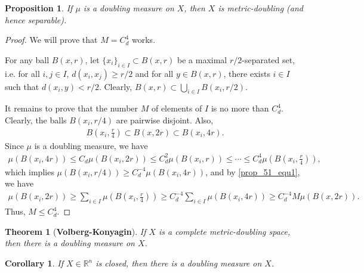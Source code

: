 \documentclass[11pt]{book}
\newtheorem{theorem}{Theorem}[chapter]
\newtheorem{corollary}{Corollary}[theorem]
\newtheorem{proposition}{Proposition}[chapter]
\theoremstyle{definition}
\numberwithin{equation}{chapter}
\begin{document}
\begin{proposition}\label{prop_51}
If $\mu$ is a doubling measure on $X$, then $X$ is metric-doubling (and hence separable).
\end{proposition}
\begin{proof}
We will prove that $M = C_d^4$ works. 

For any ball $B(x,r)$, let $\{x_i\}_{i\in I} \subset B(x,r)$ be a maximal $r/2$-separated set, i.e. for all $i,j\in I$, $d(x_i,x_j) \geq r/2$ and for all $y \in B(x,r)$, there exists $i \in I$ such that $d(x_i,y) < r/2$. Clearly, $B(x,r) \subset \bigcup_{i \in I} B\left(x_i,r/2\right)$.

It remains to prove that the number $M$ of elements of $I$ is no more than $C_d^4$. Clearly, the balls $B\left(x_i,r/4\right)$ are pairwise disjoint. Also, 
\begin{align}\label{prop_51_equ1}
    B\left(x_i,\frac{r}{4}\right) \subset B\left(x,2r\right) \subset B\left(x_i,4r\right).
\end{align}
Since $\mu$ is a doubling measure, we have
\begin{align*}
    \mu(B\left(x_i,4r\right)) \leq C_d \mu(B\left(x_i,2r\right)) \leq C_d^2 \mu(B\left(x_i,r\right)) \leq \cdots \leq C_d^4 \mu \left(B\left(x_i,\frac{r}{4}\right)\right),
\end{align*}
which implies $\mu \left(B\left(x_i,r/4\right)\right) \geq C_d^{-4} \mu \left(B\left(x_i,4r\right)\right)$, and by \eqref{prop_51_equ1}, we have
\begin{align*}
    \mu \left(B\left(x_i,2r\right)\right) \geq \sum_{i\in I} \mu\left(B\left(x_i,\frac{r}{4}\right)\right) \geq C_d^{-4} \sum_{i\in I} \mu \left(B\left(x_i,4r\right)\right) \geq C_d^{-4} M \mu \left(B\left(x,2r\right)\right).
\end{align*}
Thus, $M \leq C_d^4$.
\end{proof}

\medskip

\begin{theorem}[{\bf Volberg-Konyagin}]
If $X$ is a complete metric-doubling space, then there is a doubling measure on $X$.
\end{theorem}

\medskip

\begin{corollary}
If $X \in \mathbb{R}^n$ is closed, then there is a doubling measure on $X$.
\end{corollary}

\medskip
\end{document}
